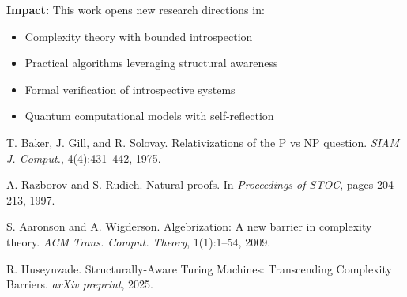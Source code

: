 \documentclass[11pt]{article}
\begin{document}
\textbf{Impact:} This work opens new research directions in:
\begin{itemize}
\item Complexity theory with bounded introspection
\item Practical algorithms leveraging structural awareness
\item Formal verification of introspective systems
\item Quantum computational models with self-reflection
\end{itemize}

\begin{thebibliography}{9}
 T. Baker, J. Gill, and R. Solovay. Relativizations of the P vs NP question. \emph{SIAM J. Comput.}, 4(4):431--442, 1975.

 A. Razborov and S. Rudich. Natural proofs. In \emph{Proceedings of STOC}, pages 204--213, 1997.

 S. Aaronson and A. Wigderson. Algebrization: A new barrier in complexity theory. \emph{ACM Trans. Comput. Theory}, 1(1):1--54, 2009.

 R. Huseynzade. Structurally-Aware Turing Machines: Transcending Complexity Barriers. \emph{arXiv preprint}, 2025.
\end{thebibliography}
\end{document}
